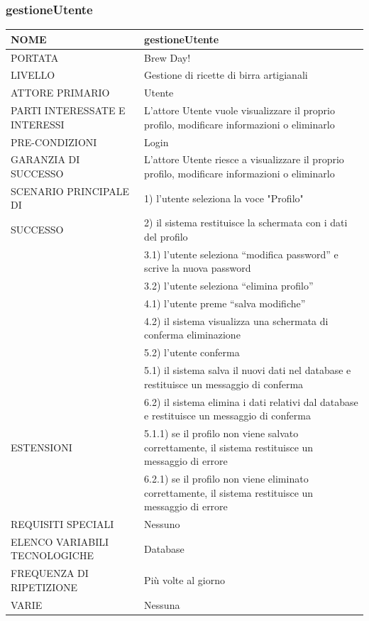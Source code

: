 \documentclass[a4paper, titlepage]{article}
\begin{document}
\subsubsection{gestioneUtente}
\begin{longtable}{p{6cm}p{7cm}}\toprule
    NOME & gestioneUtente\\\midrule
    PORTATA & Brew Day!\\\midrule
    LIVELLO & Gestione di ricette di birra artigianali\\\midrule
    ATTORE PRIMARIO & Utente\\\midrule
    PARTI INTERESSATE E INTERESSI & L’attore Utente vuole visualizzare il proprio profilo, modificare informazioni o eliminarlo\\\midrule
    PRE-CONDIZIONI & Login\\\midrule
    GARANZIA DI SUCCESSO & L’attore Utente riesce a visualizzare il proprio profilo, modificare informazioni o eliminarlo\\\midrule
    SCENARIO PRINCIPALE DI
    & 1) l’utente seleziona la voce "Profilo"\\
    SUCCESSO & 2) il sistema restituisce la schermata con i dati del profilo\\
    & 3.1) l’utente seleziona “modifica password” e scrive la nuova password\\
    & 3.2) l’utente seleziona “elimina profilo”\\
    & 4.1) l'utente preme “salva modifiche”\\
    & 4.2) il sistema visualizza una schermata di conferma eliminazione\\
    & 5.2) l’utente conferma\\
    & 5.1) il sistema salva il nuovi dati nel database e restituisce un messaggio di conferma\\
    & 6.2) il sistema elimina i dati relativi dal database e restituisce un messaggio di conferma\\\midrule
    ESTENSIONI
    & 5.1.1) se il profilo non viene salvato correttamente, il sistema restituisce un messaggio di errore\\
    & 6.2.1) se il profilo non viene eliminato correttamente, il sistema restituisce un messaggio di errore\\\midrule
    REQUISITI SPECIALI & Nessuno\\\midrule
    ELENCO VARIABILI TECNOLOGICHE & Database\\\midrule
    FREQUENZA DI RIPETIZIONE & Più volte al giorno\\\midrule
    VARIE & Nessuna\\\bottomrule
\end{longtable}
\vphantom{}
\newpage
\end{document}
